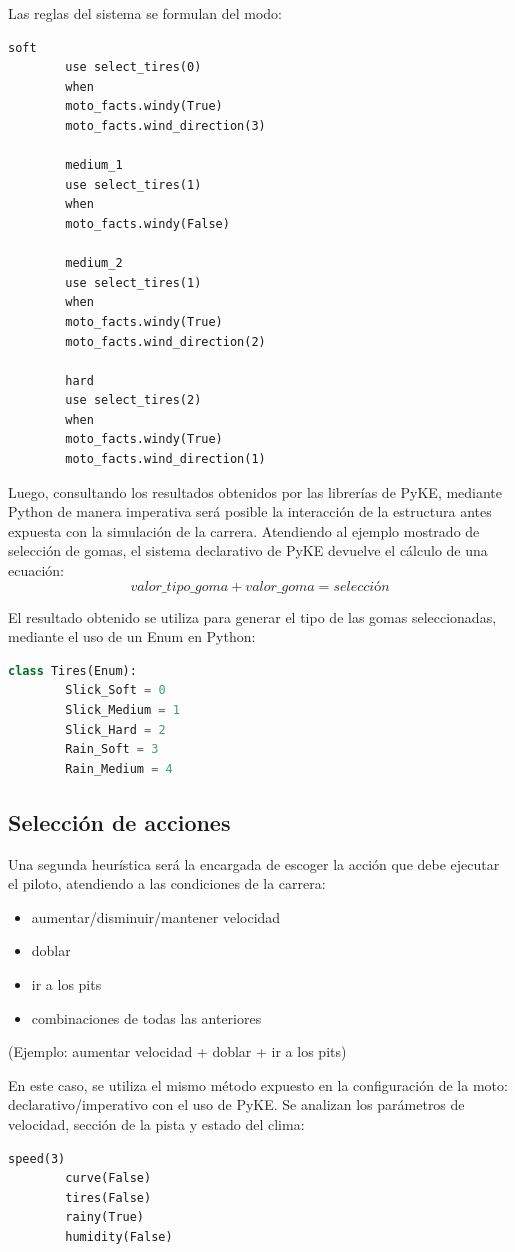 \documentclass[12pt, letterpaper,spanish]{article}
\theoremstyle{definition}
\theoremstyle{remark}
\begin{document}
	Las reglas del sistema se formulan del modo:
	\begin{lstlisting}[language={PySharp}, label={Script}]
		soft
		use select_tires(0)
		when
		moto_facts.windy(True)
		moto_facts.wind_direction(3)
		
		medium_1
		use select_tires(1)
		when
		moto_facts.windy(False)
		
		medium_2
		use select_tires(1)
		when
		moto_facts.windy(True)
		moto_facts.wind_direction(2)
		
		hard
		use select_tires(2)
		when
		moto_facts.windy(True)
		moto_facts.wind_direction(1)
	\end{lstlisting}
	
	Luego, consultando los resultados obtenidos por las librerías de PyKE\cite{pyke}, mediante Python de manera imperativa será posible la interacción de la estructura antes expuesta con la simulación de la carrera.
	Atendiendo al ejemplo mostrado de selección de gomas, el sistema declarativo de PyKE\cite{pyke} devuelve el cálculo de una ecuación:
	$$valor\_tipo\_goma + valor\_goma = selección$$
	
	El resultado obtenido se utiliza para generar el tipo de las gomas seleccionadas, mediante el uso de un Enum en Python:
	\begin{lstlisting}[language={Python}, label={Script}]
		class Tires(Enum):
		Slick_Soft = 0
		Slick_Medium = 1
		Slick_Hard = 2
		Rain_Soft = 3
		Rain_Medium = 4
	\end{lstlisting}
	
	\subsection{Selección de acciones}
	Una segunda heurística será la encargada de escoger la acción que debe ejecutar el piloto, atendiendo a las condiciones de la carrera:
	\begin{itemize}
		\item aumentar/disminuir/mantener velocidad
		\item doblar
		\item ir a los pits
		\item combinaciones de todas las anteriores
	\end{itemize}
	(Ejemplo: aumentar velocidad + doblar + ir a los pits)
	
	En este caso, se utiliza el mismo método expuesto en la configuración de la moto: declarativo/imperativo con el uso de PyKE.
	Se analizan los parámetros de velocidad, sección de la pista y estado del clima:
	\begin{lstlisting}[language={PySharp}, label={Script}]
		speed(3)
		curve(False)
		tires(False)
		rainy(True)
		humidity(False)
	\end{lstlisting}
	
\end{document}

